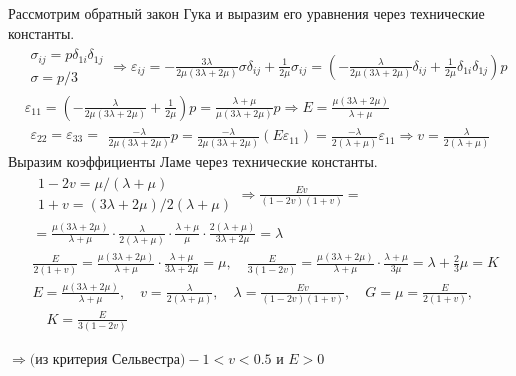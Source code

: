 Рассмотрим обратный закон Гука и выразим его уравнения через технические константы.
$$
\begin{aligned}
& \begin{array}{c}
\sigma_{i j}=p \delta_{1 i} \delta_{1 j} \\
\sigma=p / 3
\end{array} \Rightarrow \varepsilon_{i j}=-\frac{3 \lambda}{2 \mu(3 \lambda+2 \mu)} \sigma \delta_{i j}+\frac{1}{2 \mu} \sigma_{i j}=\left(-\frac{\lambda}{2 \mu(3 \lambda+2 \mu)} \delta_{i j}+\frac{1}{2 \mu} \delta_{1 i} \delta_{1 j}\right) p \\
& \varepsilon_{11}=\left(-\frac{\lambda}{2 \mu(3 \lambda+2 \mu)}+\frac{1}{2 \mu}\right) p=\frac{\lambda+\mu}{\mu(3 \lambda+2 \mu)} p \Rightarrow E=\frac{\mu(3 \lambda+2 \mu)}{\lambda+\mu} \\
& \begin{array}{l}
\varepsilon_{22} =
\varepsilon_{33}
=\end{array} \frac{-\lambda}{2 \mu(3 \lambda+2 \mu)} p=\frac{-\lambda}{2 \mu(3 \lambda+2 \mu)}\left(E \varepsilon_{11}\right)=\frac{-\lambda}{2(\lambda+\mu)} \varepsilon_{11} \Rightarrow v=\frac{\lambda}{2(\lambda+\mu)} 
\end{aligned}
$$
Выразим коэффициенты Ламе через технические константы.
$$
\begin{aligned}
& \begin{array}{c}
1-2 v=\mu /(\lambda+\mu) \\
1+v=(3 \lambda+2 \mu) / 2(\lambda+\mu)
\end{array} \Rightarrow \frac{E v}{(1-2 v)(1+v)}= \\& =\frac{\mu(3 \lambda+2 \mu)}{\lambda+\mu} \cdot \frac{\lambda}{2(\lambda+\mu)} \cdot \frac{\lambda+\mu}{\mu} \cdot \frac{2(\lambda+\mu)}{3 \lambda+2 \mu}=\lambda \\
& \frac{E}{2(1+v)}=\frac{\mu(3 \lambda+2 \mu)}{\lambda+\mu} \cdot \frac{\lambda+\mu}{3 \lambda+2 \mu}=\mu, \quad \frac{E}{3(1-2 v)}=\frac{\mu(3 \lambda+2 \mu)}{\lambda+\mu} \cdot \frac{\lambda+\mu}{3 \mu}=\lambda+\frac{2}{3} \mu=K \\
& E=\frac{\mu(3 \lambda+2 \mu)}{\lambda+\mu}, \quad v=\frac{\lambda}{2(\lambda+\mu)}, \quad \lambda=\frac{E v}{(1-2 v)(1+v)}, \quad G=\mu=\frac{E}{2(1+v)}, \\ & \quad K=\frac{E}{3(1-2 v)}
\end{aligned}
$$


$\Rightarrow\text{(из критерия Сельвестра)} -1<v<0.5 \text{ и } E>0 $

